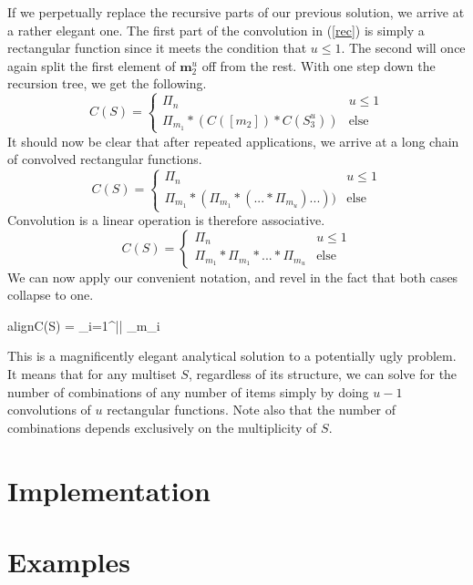 \documentclass{article}
\newcommand{\boxedeq}[2]{\begin{empheq}[box={\fboxsep=6pt\fbox}]{align}\label{#1}#2\end{empheq}}
\newcommand{\Conv}{\mathop{\scalebox{1.5}{\raisebox{-0.2ex}{$\ast$}}}}%
\begin{document}
If we perpetually replace the recursive parts of our previous solution, we arrive at a rather elegant one. The first part of the convolution in (\ref{rec}) is simply a rectangular function since it meets the condition that $u\leq 1$. The second will once again split the first element of $\bm{m}_2^u$ off from the rest. With one step down the recursion tree, we get the following.
\begin{equation}
    C(S) = \begin{cases}\Pi_n & u \leq 1 \\
    \Pi_{m_1} * (C([m_2]) * C(S_3^u)) & \text{else} \end{cases}
\end{equation}
It should now be clear that after repeated applications, we arrive at a long chain of convolved rectangular functions.
\begin{equation}
    C(S) = \begin{cases}\Pi_n & u \leq 1 \\
    \Pi_{m_1} * (\Pi_{m_1} * (... * \Pi_{m_u})...)) & \text{else} \end{cases}
\end{equation}
Convolution is a linear operation is therefore associative.
\begin{equation}
    C(S) = \begin{cases}\Pi_n & u \leq 1 \\
    \Pi_{m_1} * \Pi_{m_1} * ... * \Pi_{m_u} & \text{else} \end{cases}
\end{equation}
We can now apply our convenient notation, and revel in the fact that both cases collapse to one.
\boxedeq{eq:first}{C(S) = \Conv_{i=1}^{||} \Pi_{m_i}}

This is a magnificently elegant analytical solution to a potentially ugly problem. It means that for any multiset $S$, regardless of its structure, we can solve for the number of combinations of any number of items simply by doing $u-1$ convolutions of $u$ rectangular functions. Note also that the number of combinations depends exclusively on the multiplicity of $S$.

\section{Implementation}

\pagebreak


\section{Examples}
\end{document}
